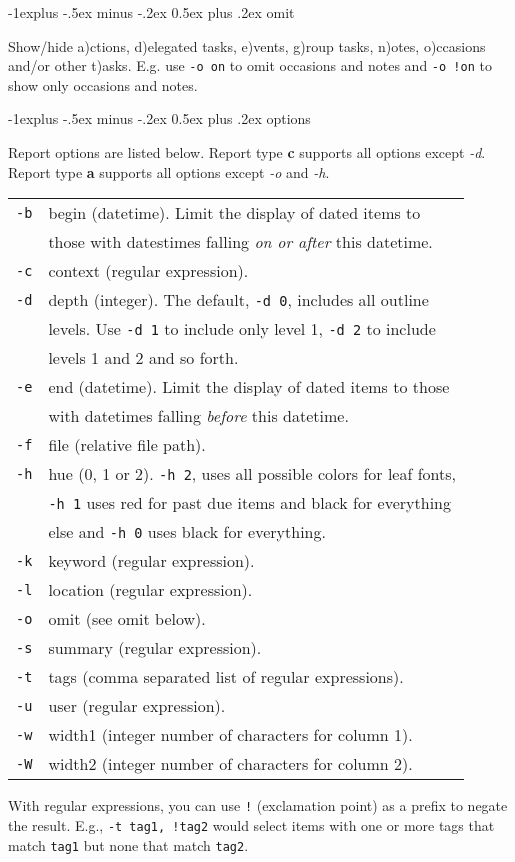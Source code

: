 \documentclass[9pt,landscape]{article}
\makeatletter
\renewcommand{\subsection}{\@startsection{subsection}{2}{0mm}%
                                {-1explus -.5ex minus -.2ex}%
                                {0.5ex plus .2ex}%
                                {\normalfont\normalsize\bfseries}}
\makeatother
\begin{document}
\begin{multicols}{3}
\subsection{omit}

Show/hide a)ctions, d)elegated tasks, e)vents, g)roup tasks, n)otes, o)ccasions and/or other t)asks. E.g. use \verb'-o on' to omit occasions and notes and \verb'-o !on' to show only occasions and notes.

\subsection{options}

Report options are listed below. Report type \textbf{c} supports all options except \emph{-d}. Report type \textbf{a} supports all options except \emph{-o} and \emph{-h}.
\begin{tabular}{@{}ll@{}}
\texttt{-b} & begin (datetime). Limit the display of dated items to \\
           & those with datestimes falling \emph{on or after} this datetime. \\
\texttt{-c} & context (regular expression). \\
\texttt{-d} & depth (integer). The default, \verb'-d 0', includes all outline \\
            & levels. Use \verb'-d 1' to include only level 1, \verb'-d 2' to include \\
            & levels 1 and 2 and so forth. \\
\texttt{-e} & end (datetime). Limit the display of dated items to those \\
          & with datetimes falling \emph{before} this datetime.\\
\texttt{-f} & file (relative file path).\\
\texttt{-h} & hue (0, 1 or 2). \verb'-h 2', uses all possible colors for leaf fonts,\\
            & \verb'-h 1' uses red for past due items and black for everything \\
            & else and \verb'-h 0' uses black for everything. \\
\texttt{-k} & keyword (regular expression). \\
\texttt{-l} & location (regular expression). \\
\texttt{-o} & omit (see omit below). \\
\texttt{-s} & summary (regular expression). \\
\texttt{-t} & tags (comma separated list of regular expressions). \\
\texttt{-u} & user (regular expression). \\
\texttt{-w} & width1 (integer number of characters for column 1). \\
\texttt{-W} & width2 (integer number of characters for column 2). \\
\end{tabular}
With regular expressions, you can use \verb'!' (exclamation point) as a prefix to negate the result. E.g., \verb'-t tag1, !tag2' would select items with one or more tags that match \verb!tag1! but none that match \verb!tag2!.


\end{multicols}
\end{document}
